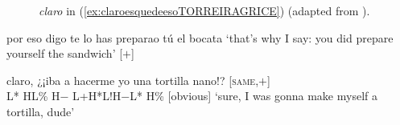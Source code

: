 \begin{figure}
\begin{floatrow}
	{\caption[Low-high-low intonation on \textit{claro}]{\textit{claro} in (\ref{ex:claroesquedeesoTORREIRAGRICE}) (adapted from \cite[15]{TorreiraGrice.2018}).}
	\label{fig:claroTORREIRAGRICE}}%
\end{floatrow}
\end{figure}



\begin{exe}
		\ex \citep[59, line 353]{BrizValEsCo.2002corpus}
\label{ex:claro1BRIZexampleprovocation} 
		\begin{xlist}[A:]
		  por eso digo te lo has preparao tú el bocata
		\glt `that's why I say: you did prepare yourself the sandwich' \hfill [$+$]
		\end{xlist}
		
		\ex \label{ex:claro1BRIZexampleresponse} 		\begin{xlist}[A:]
		  claro, ¿¡iba a hacerme yo una tortilla nano!? \hfill [\textsc{same},$+$] \\
		\hspace*{.1em} L* HL\% \hspace*{4em} H$-$\hspace*{2.5em} L+H*L!H$-$L* H\% \hfill [obvious] 
		\glt `sure, I was gonna make myself a tortilla, dude'
		\end{xlist}
\end{exe}

